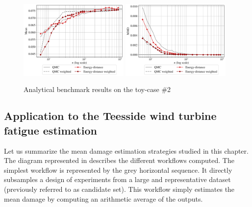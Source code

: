 \begin{figure}[!h]
\begin{center}
    \includegraphics[width=0.48\textwidth]{part2/figures/DCE/analytical_bench/GSobol_10D_(normal_input)_convergence_ED.pdf}
    \includegraphics[width=0.48\textwidth]{part2/figures/DCE/analytical_bench/GSobol_10D_(normal_input)_convergence_MMD_ED.pdf}\\
\end{center}
\caption{Analytical benchmark results on the toy-case \#2} \label{fig:toy-case2}
\end{figure}

\subsection{Application to the Teesside wind turbine fatigue estimation}
Let us summarize the mean damage estimation strategies studied in this chapter. 
The diagram represented in  describes the different workflows computed. 
The simplest workflow is represented by the grey horizontal sequence. 
It directly subsamples a design of experiments from a large and representative dataset (previously referred to as candidate set). 
This workflow simply estimates the mean damage by computing an arithmetic average of the outputs. 


